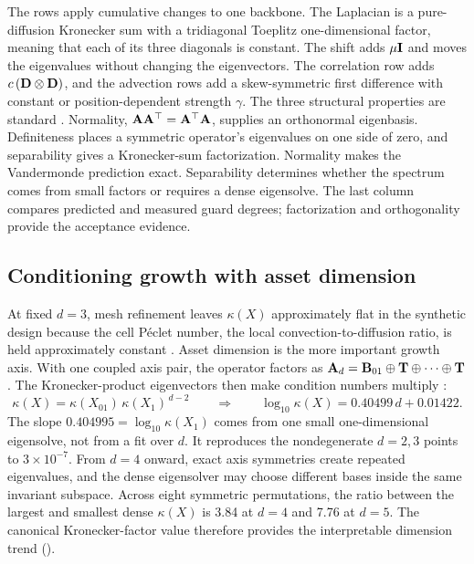 The rows apply cumulative changes to one backbone. The Laplacian is a pure-diffusion Kronecker sum with a tridiagonal Toeplitz one-dimensional factor, meaning that each of its three diagonals is constant. The shift adds $\mu\mathbf{I}$ and moves the eigenvalues without changing the eigenvectors. The correlation row adds $c\,(\mathbf{D}\otimes\mathbf{D})$, and the advection rows add a skew-symmetric first difference with constant or position-dependent strength $\gamma$. The three structural properties are standard \cite{trefethen-1997,golub-vanloan-2013}. Normality, $\mathbf{A}\mathbf{A}^\top=\mathbf{A}^\top\mathbf{A}$, supplies an orthonormal eigenbasis. Definiteness places a symmetric operator's eigenvalues on one side of zero, and separability gives a Kronecker-sum factorization. Normality makes the Vandermonde prediction exact. Separability determines whether the spectrum comes from small factors or requires a dense eigensolve. The last column compares predicted and measured guard degrees; factorization and orthogonality provide the acceptance evidence.

\subsection{Conditioning growth with asset dimension}\label{sec:dsweep}

At fixed $d=3$, mesh refinement leaves $\kappa(X)$ approximately flat in the synthetic design because the cell P\'eclet number, the local convection-to-diffusion ratio, is held approximately constant \cite{hundsdorfer-verwer-2003}. Asset dimension is the more important growth axis. With one coupled axis pair, the operator factors as $\mathbf{A}_d=\mathbf{B}_{01}\oplus\mathbf{T}\oplus\cdots\oplus\mathbf{T}$. The Kronecker-product eigenvectors then make condition numbers multiply \cite{golub-vanloan-2013}:
\begin{equation}
\kappa(X) = \kappa(X_{01})\, \kappa(X_1)^{\,d-2}
\qquad\Longrightarrow\qquad
\log_{10}\kappa(X) = 0.40499\, d + 0.01422.
\label{eq:tensor-law}
\end{equation}
The slope $0.404995=\log_{10}\kappa(X_1)$ comes from one small one-dimensional eigensolve, not from a fit over $d$. It reproduces the nondegenerate $d=2,3$ points to $3\times10^{-7}$. From $d=4$ onward, exact axis symmetries create repeated eigenvalues, and the dense eigensolver may choose different bases inside the same invariant subspace. Across eight symmetric permutations, the ratio between the largest and smallest dense $\kappa(X)$ is 3.84 at $d=4$ and 7.76 at $d=5$. The canonical Kronecker-factor value therefore provides the interpretable dimension trend ().

